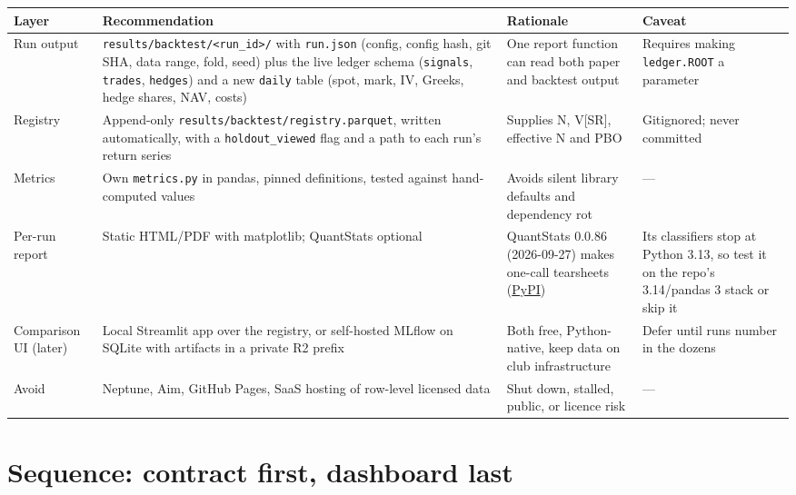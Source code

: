 \documentclass{article}
\begin{document}
\begin{center}\small
\begin{tabularx}{\linewidth}{>{\raggedright\arraybackslash}X >{\raggedright\arraybackslash}X >{\raggedright\arraybackslash}X >{\raggedright\arraybackslash}X}
\toprule
\textbf{Layer} & \textbf{Recommendation} & \textbf{Rationale} & \textbf{Caveat} \\
\midrule
Run output & \texttt{results/\allowbreak{}backtest/\allowbreak{}<run\_\allowbreak{}id>/\allowbreak{}} with \texttt{run.\allowbreak{}json} (config, config hash, git SHA, data range, fold, seed) plus the live ledger schema (\texttt{signals}, \texttt{trades}, \texttt{hedges}) and a new \texttt{daily} table (spot, mark, IV, Greeks, hedge shares, NAV, costs) & One report function can read both paper and backtest output & Requires making \texttt{ledger.\allowbreak{}ROOT} a parameter \\
Registry & Append-only \texttt{results/\allowbreak{}backtest/\allowbreak{}registry.\allowbreak{}parquet}, written automatically, with a \texttt{holdout\_\allowbreak{}viewed} flag and a path to each run's return series & Supplies N, V[SR], effective N and PBO & Gitignored; never committed \\
Metrics & Own \texttt{metrics.\allowbreak{}py} in pandas, pinned definitions, tested against hand-computed values & Avoids silent library defaults and dependency rot & --- \\
Per-run report & Static HTML/\allowbreak{}PDF with matplotlib; QuantStats optional & QuantStats 0.0.86 (2026-09-27) makes one-call tearsheets (\href{https://pypi.org/project/quantstats/}{PyPI}) & Its classifiers stop at Python 3.13, so test it on the repo's 3.14/\allowbreak{}pandas 3 stack or skip it \\
Comparison UI (later) & Local Streamlit app over the registry, or self-hosted MLflow on SQLite with artifacts in a private R2 prefix & Both free, Python-native, keep data on club infrastructure & Defer until runs number in the dozens \\
Avoid & Neptune, Aim, GitHub Pages, SaaS hosting of row-level licensed data & Shut down, stalled, public, or licence risk & --- \\
\bottomrule
\end{tabularx}
\end{center}

\section{Sequence: contract first, dashboard last}
\end{document}
